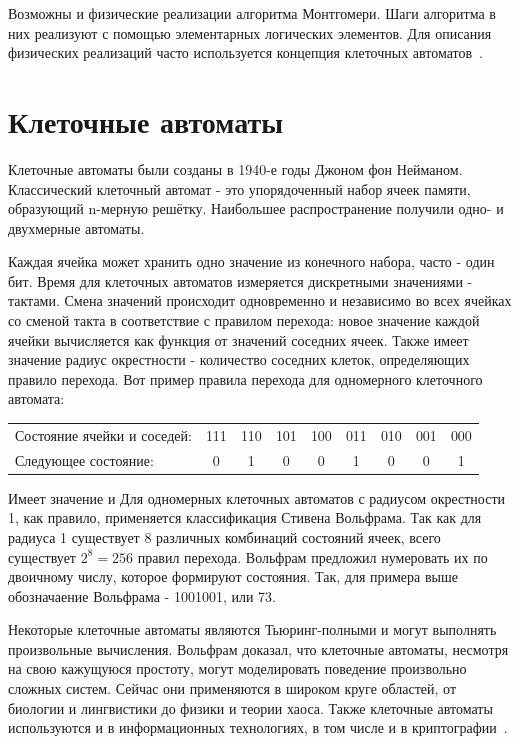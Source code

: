 \documentclass[times,specification,annotation]{itmo-student-thesis}
\begin{document}
Возможны и физические реализации алгоритма Монтгомери.
Шаги алгоритма в них реализуют с помощью элементарных логических элементов.
Для описания физических реализаций часто используется концепция клеточных автоматов~\cite{jeo07, ku04}.

\section{Клеточные автоматы}\label{sec:cells}

Клеточные автоматы были созданы в 1940-е годы Джоном фон Нейманом.
Классический клеточный автомат - это упорядоченный набор ячеек памяти, образующий n-мерную решётку.
Наибольшее распространение получили одно- и двухмерные автоматы.

Каждая ячейка может хранить одно значение из конечного набора, часто - один бит.
Время для клеточных автоматов измеряется дискретными значениями - тактами.
Смена значений происходит одновременно и независимо во всех ячейках со сменой такта в соответствие с правилом перехода:
новое значение каждой ячейки вычисляется как функция от значений соседних ячеек.
Также имеет значение радиус окрестности - количество соседних клеток, определяющих правило перехода.
Вот пример правила перехода для одномерного клеточного автомата:
\begin{table}[h]
\begin{tabular}{ l l l l l l l l l }
Состояние ячейки и соседей: & 111 & 110 & 101 & 100 & 011 & 010 & 001 & 000 \\
Следующее состояние: & ~0 & ~1 & ~0 & ~0 & ~1 & ~0 & ~0 & ~1 \\
\end{tabular}
\end{table}
Имеет значение и
Для одномерных клеточных автоматов с радиусом окрестности 1, как правило, применяется классификация Стивена Вольфрама.
Так как для радиуса 1 существует 8 различных комбинаций состояний ячеек, всего существует $2^8=256$ правил перехода.
Вольфрам предложил нумеровать их по двоичному числу, которое формируют состояния.
Так, для примера выше обозначаение Вольфрама - 1001001, или 73.

Некоторые клеточные автоматы являются Тьюринг-полными и могут выполнять произвольные вычисления.
Вольфрам доказал, что клеточные автоматы, несмотря на свою кажущуюся простоту, могут моделировать поведение произвольно сложных систем.
Сейчас они применяются в широком круге областей, от биологии и лингвистики до физики и теории хаоса.
Также клеточные автоматы используются и в информационных технологиях, в том числе и в криптографии~\cite{zhu17}.
\end{document}
